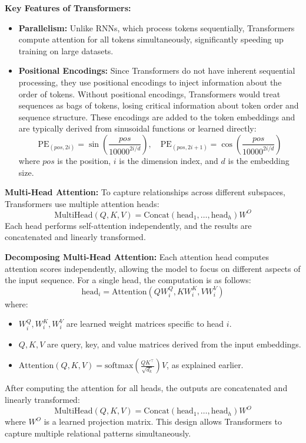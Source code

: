 \begin{flushleft}
    \textbf{Key Features of Transformers:}
    \begin{itemize}
        \item \textbf{Parallelism:} Unlike RNNs, which process tokens sequentially, Transformers compute attention for all tokens simultaneously, significantly speeding up training on large datasets.
        \item \textbf{Positional Encodings:} Since Transformers do not have inherent sequential processing, they use positional encodings to inject information about the order of tokens. Without positional encodings, Transformers would treat sequences as bags of tokens, losing critical information about token order and sequence structure. These encodings are added to the token embeddings and are typically derived from sinusoidal functions or learned directly:
        \[
        \text{PE}_{(pos, 2i)} = \sin\left(\frac{pos}{10000^{2i/d}}\right), \quad
        \text{PE}_{(pos, 2i+1)} = \cos\left(\frac{pos}{10000^{2i/d}}\right)
        \]
        where \(pos\) is the position, \(i\) is the dimension index, and \(d\) is the embedding size.
    \end{itemize}

    \textbf{Multi-Head Attention:} To capture relationships across different subspaces, Transformers use multiple attention heads:
    \[
    \text{MultiHead}(Q, K, V) = \text{Concat}(\text{head}_1, \dots, \text{head}_h)W^O
    \]
    Each head performs self-attention independently, and the results are concatenated and linearly transformed. \break

    \textbf{Decomposing Multi-Head Attention:}
    Each attention head computes attention scores independently, allowing the model to focus on different aspects of the input sequence. For a single head, the computation is as follows:
    \[
    \text{head}_i = \text{Attention}(QW_i^Q, KW_i^K, VW_i^V)
    \]
    where:
    \begin{itemize}
        \item \(W_i^Q, W_i^K, W_i^V\) are learned weight matrices specific to head \(i\).
        \item \(Q, K, V\) are query, key, and value matrices derived from the input embeddings.
        \item \(\text{Attention}(Q, K, V) = \text{softmax}\left(\frac{QK^\top}{\sqrt{d_k}}\right)V\), as explained earlier.
    \end{itemize}
    
    After computing the attention for all heads, the outputs are concatenated and linearly transformed:
    \[
    \text{MultiHead}(Q, K, V) = \text{Concat}(\text{head}_1, \dots, \text{head}_h)W^O
    \]
    where \(W^O\) is a learned projection matrix. This design allows Transformers to capture multiple relational patterns simultaneously. \break


\end{flushleft}
